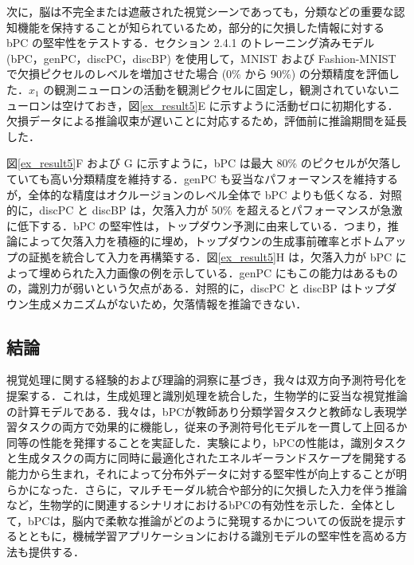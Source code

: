 \documentclass[a4paper, titlepage]{jsarticle}
\begin{document}
次に，脳は不完全または遮蔽された視覚シーンであっても，分類などの重要な認知機能を保持することが知られているため，部分的に欠損した情報に対する bPC の堅牢性をテストする．セクション 2.4.1 のトレーニング済みモデル (bPC，genPC，discPC，discBP) を使用して，MNIST および Fashion-MNIST で欠損ピクセルのレベルを増加させた場合 (0\% から 90\%) の分類精度を評価した．$x_1$ の観測ニューロンの活動を観測ピクセルに固定し，観測されていないニューロンは空けておき，図\ref{ex_result5}E に示すように活動ゼロに初期化する．欠損データによる推論収束が遅いことに対応するため，評価前に推論期間を延長した．
\par
図\ref{ex_result5}F および G に示すように，bPC は最大 80\% のピクセルが欠落していても高い分類精度を維持する．genPC も妥当なパフォーマンスを維持するが，全体的な精度はオクルージョンのレベル全体で bPC よりも低くなる．対照的に，discPC と discBP は，欠落入力が 50\% を超えるとパフォーマンスが急激に低下する．bPC の堅牢性は，トップダウン予測に由来している．つまり，推論によって欠落入力を積極的に埋め，トップダウンの生成事前確率とボトムアップの証拠を統合して入力を再構築する．図\ref{ex_result5}H は，欠落入力が bPC によって埋められた入力画像の例を示している．genPC にもこの能力はあるものの，識別力が弱いという欠点がある．対照的に，discPC と discBP はトップダウン生成メカニズムがないため，欠落情報を推論できない．
\subsection{結論}
視覚処理に関する経験的および理論的洞察に基づき，我々は双方向予測符号化を提案する．これは，生成処理と識別処理を統合した，生物学的に妥当な視覚推論の計算モデルである．我々は，bPCが教師あり分類学習タスクと教師なし表現学習タスクの両方で効果的に機能し，従来の予測符号化モデルを一貫して上回るか同等の性能を発揮することを実証した．実験により，bPCの性能は，識別タスクと生成タスクの両方に同時に最適化されたエネルギーランドスケープを開発する能力から生まれ，それによって分布外データに対する堅牢性が向上することが明らかになった．さらに，マルチモーダル統合や部分的に欠損した入力を伴う推論など，生物学的に関連するシナリオにおけるbPCの有効性を示した．全体として，bPCは，脳内で柔軟な推論がどのように発現するかについての仮説を提示するとともに，機械学習アプリケーションにおける識別モデルの堅牢性を高める方法も提供する．
\end{document}
